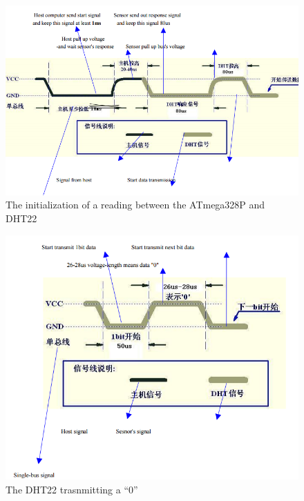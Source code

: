 			\begin{figure}[h!]
				\centering
				\includegraphics[width=\textwidth, angle=0]{DHT22init}
				\caption{The initialization of a reading between the ATmega328P and DHT22}
				\label{fig:DHT22init}
			\end{figure}
			
			\begin{figure}[h!]
				\centering
				\includegraphics[width=\textwidth, angle=0]{DHT22low}
				\caption{The DHT22 trasnmitting a ``0''}
				\label{fig:DHT22low}
			\end{figure}
			
